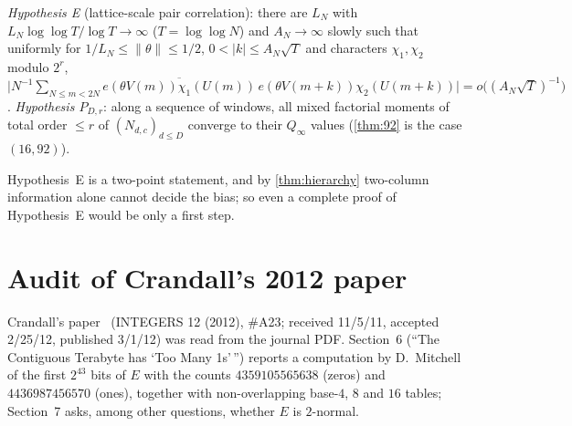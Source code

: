 \documentclass[11pt]{article}
\newcommand{\Qinf}{{Q_\infty}}
\begin{document}
\begin{definition}
\emph{Hypothesis E} (lattice-scale pair correlation): there are $L_N$ with $L_N\log\log T/\log T\to\infty$ ($T=\log\log N$) and $A_N\to\infty$ slowly such that uniformly for $1/L_N\le\|\theta\|\le1/2$, $0<|k|\le A_N\sqrt T$ and characters $\chi_1,\chi_2$ modulo $2^r$,
$\bigl|N^{-1}\sum_{N\le m<2N}\overline{e(\theta V(m))\chi_1(U(m))}\,e(\theta V(m{+}k))\chi_2(U(m{+}k))\bigr|=o\bigl((A_N\sqrt T)^{-1}\bigr)$.
\emph{Hypothesis $P_{D,r}$}: along a sequence of windows, all mixed factorial moments of total order $\le r$ of $(N_{d,c})_{d\le D}$ converge to their $\Qinf$ values (\cref{thm:92} is the case $(16,92)$).
\end{definition}
Hypothesis~E is a two-point statement, and by \cref{thm:hierarchy} two-column information alone cannot decide the bias; so even a complete proof of Hypothesis~E would be only a first step.

\section{Audit of Crandall's 2012 paper}\label{sec:crandall}

Crandall's paper~\cite{crandall2012} (INTEGERS 12 (2012), \#A23; received 11/5/11, accepted 2/25/12, published 3/1/12) was read from the journal PDF. Section~6 (``The Contiguous Terabyte has `Too Many 1s'\,'') reports a computation by D.~Mitchell of the first $2^{43}$ bits of $E$ with the counts $4359105565638$ (zeros) and $4436987456570$ (ones), together with non-overlapping base-$4$, $8$ and $16$ tables; Section~7 asks, among other questions, whether $E$ is $2$-normal.
\end{document}
